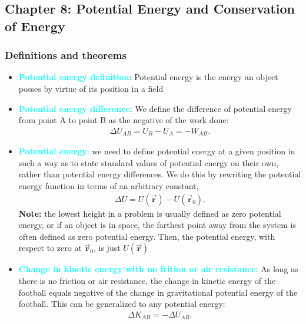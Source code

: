 \documentclass{report}
\begin{document}
    \pagebreak 
    \subsection{Chapter 8: Potential Energy and Conservation of Energy}
    \bigbreak \noindent 
    \subsubsection{Definitions and theorems}
    \begin{itemize}
        \item \textbf{\textcolor{cyan}{Potential energy definition}}: Potential energy is the energy an object posses by virtue of its position in a field
        \item \textbf{\textcolor{cyan}{Potential energy difference}}: We define the difference of potential energy from point A to point B as the negative of the work done:
            \begin{align*}
                \Delta U_{AB} = U_{B} - U_{A} = -W_{AB}
            .\end{align*}
        \item \textbf{\textcolor{cyan}{Potential energy}}: we need to define potential energy at a given position in such a way as to state standard values of potential energy on their own, rather than potential energy differences. We do this by rewriting the potential energy function in terms of an arbitrary constant,
            \begin{align*}
                \Delta U  = U(\vec{\mathbf{r}}) - U(\vec{\mathbf{r}}_{0})
            .\end{align*}
            \bigbreak \noindent 
            \textbf{Note:} the lowest height in a problem is usually defined as zero potential energy, or if an object is in space, the farthest point away from the system is often defined as zero potential energy. Then, the potential energy, with respect to zero at $\vec{\mathbf{r}}_{0}$, is just  $U(\vec{\mathbf{r}})$
        \item \textbf{\textcolor{cyan}{Change in kinetic energy with no frition or air resistance}}: As long as there is no friction or air resistance, the change in kinetic energy of the football equals negative of the change in gravitational potential energy of the football. This can be generalized to any potential energy:
            \begin{align*}
                \Delta K_{AB} = -\Delta U_{AB}
            .\end{align*}

\end{itemize}
\end{document}
